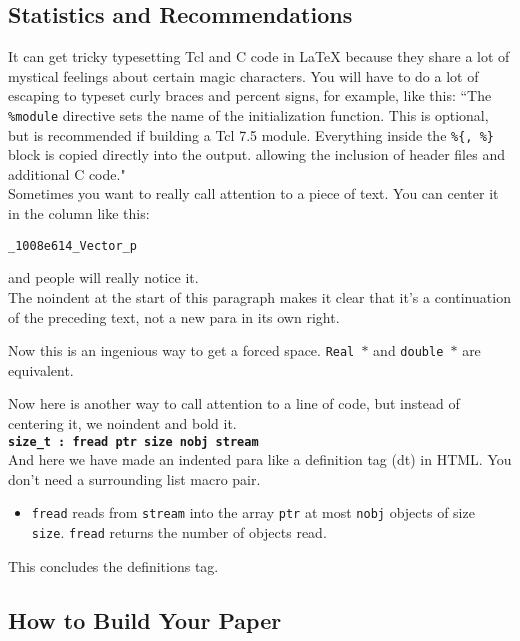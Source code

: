 \documentclass[letterpaper,twocolumn,10pt]{article}
\begin{document}
\subsection{Statistics and Recommendations}

It can get tricky typesetting Tcl and C code in LaTeX because they share
a lot of mystical feelings about certain magic characters.  You
will have to do a lot of escaping to typeset curly braces and percent
signs, for example, like this:
``The {\tt \%module} directive
sets the name of the initialization function.  This is optional, but is
recommended if building a Tcl 7.5 module.
Everything inside the {\tt \%\{, \%\}}
block is copied directly into the output. allowing the inclusion of
header files and additional C code." \\

Sometimes you want to really call attention to a piece of text.  You
can center it in the column like this:
\begin{center}
{\tt \_1008e614\_Vector\_p}
\end{center}
and people will really notice it.\\

\noindent
The noindent at the start of this paragraph makes it clear that it's
a continuation of the preceding text, not a new para in its own right.


Now this is an ingenious way to get a forced space.
{\tt Real~$*$} and {\tt double~$*$} are equivalent. 

Now here is another way to call attention to a line of code, but instead
of centering it, we noindent and bold it.\\

\noindent
{\bf \tt size\_t : fread ptr size nobj stream } \\

And here we have made an indented para like a definition tag (dt)
in HTML.  You don't need a surrounding list macro pair.
\begin{itemize}
\item[]  {\tt fread} reads from {\tt stream} into the array {\tt ptr} at
most {\tt nobj} objects of size {\tt size}.   {\tt fread} returns
the number of objects read. 
\end{itemize}
This concludes the definitions tag.

\subsection{How to Build Your Paper}
\end{document}
